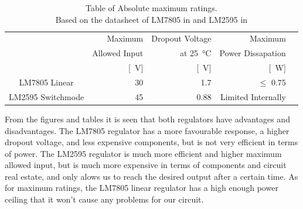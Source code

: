 \begin{table}[H]
    \centering
    \footnotesize
    \captionsetup{justification=centering}
    \caption{Table of Absolute maximum ratings.\\ Based on the datasheet of LM7805 in \cite{LM7805} and LM2595 in\cite{LM2595} \\}
    \begin{tabular}{c@{\qquad}rrrr}
    \toprule
         & Maximum & Dropout Voltage  & Maximum \\
         & Allowed Input & at \SI{25}{\celsius} & Power Dissapation\\
         & [\SI{}{\volt}] & [\SI{}{\volt}]& [\SI{}{\watt}]\\
    \midrule
         LM7805 Linear & 30 & 1.7 & $\leq$ 0.75 \\
         LM2595 Switchmode & 45 & 0.88 & Limited Internally \\
    \bottomrule
    \end{tabular}
    \label{tab:max_ratings}
\end{table}

\par
From the figures and tables it is seen that both regulators have advantages and disadvantages. \newline
The LM7805 regulator has a more favourable response, a higher dropout voltage, and less expensive components, but is not very efficient in terms of power.\newline
The LM2595 regulator is much more efficient and higher maximum allowed input, but is much more expensive in terms of components and circuit real estate, and only alows us to reach the desired output after a certain time.
As for maximum ratings, the LM7805 linear regulator has a high enough power ceiling that it won't cause any problems for our circuit.


